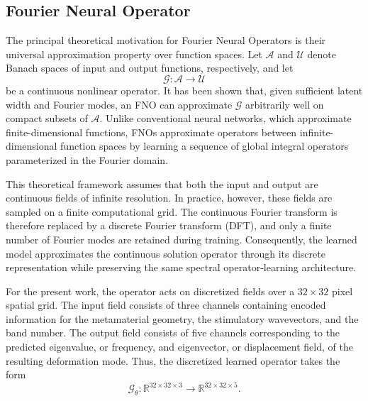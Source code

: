 \documentclass[preprint,review,12pt,numafflabel]{elsarticle}
\begin{document}
\subsection{Fourier Neural Operator}
\label{ssec:fourier_neural_operator}

The principal theoretical motivation for Fourier Neural Operators is their universal approximation property over function spaces. Let $\mathcal{A}$ and $\mathcal{U}$ denote Banach spaces of input and output functions, respectively, and let
\begin{equation}
\mathcal{G}:\mathcal{A}\rightarrow\mathcal{U}
\end{equation}
be a continuous nonlinear operator. It has been shown that, given sufficient latent width and Fourier modes, an FNO can approximate $\mathcal{G}$ arbitrarily well on compact subsets of $\mathcal{A}$. Unlike conventional neural networks, which approximate finite-dimensional functions, FNOs approximate operators between infinite-dimensional function spaces by learning a sequence of global integral operators parameterized in the Fourier domain.

This theoretical framework assumes that both the input and output are continuous fields of infinite resolution. In practice, however, these fields are sampled on a finite computational grid. The continuous Fourier transform is therefore replaced by a discrete Fourier transform (DFT), and only a finite number of Fourier modes are retained during training. Consequently, the learned model approximates the continuous solution operator through its discrete representation while preserving the same spectral operator-learning architecture.

For the present work, the operator acts on discretized fields over a $32\times32$ pixel spatial grid. The input field consists of three channels containing encoded information for the metamaterial geometry, the stimulatory wavevectors, and the band number. The output field consists of five channels corresponding to the predicted eigenvalue, or frequency, and eigenvector, or displacement field, of the resulting deformation mode. Thus, the discretized learned operator takes the form
\begin{equation}
\mathcal{G}_{\theta}:
\mathbb{R}^{32\times32\times3}
\rightarrow
\mathbb{R}^{32\times32\times5}.
\end{equation}
\end{document}
